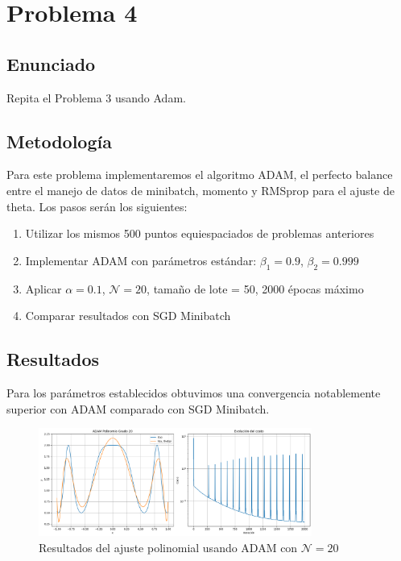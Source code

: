 \documentclass{article}
\begin{document}
\section{Problema 4}

\subsection{Enunciado}

Repita el Problema 3 usando Adam.

\subsection{Metodología}

Para este problema implementaremos el algoritmo ADAM, el perfecto balance entre el manejo de datos de minibatch, momento y RMSprop para el ajuste de theta. Los pasos serán los siguientes:

\begin{enumerate}
    \item Utilizar los mismos 500 puntos equiespaciados de problemas anteriores
    \item Implementar ADAM con parámetros estándar: $\beta_1 = 0.9$, $\beta_2 = 0.999$
    \item Aplicar $\alpha = 0.1$, $\mathcal{N} = 20$, tamaño de lote = 50, 2000 épocas máximo
    \item Comparar resultados con SGD Minibatch
\end{enumerate}

\subsection{Resultados}
\setcounter{equation}{0}

Para los parámetros establecidos obtuvimos una convergencia notablemente superior con ADAM comparado con SGD Minibatch.

\begin{figure}[H]
    \centering
    \includegraphics[width=0.8\textwidth]{images/4_adam.png}
    \caption{Resultados del ajuste polinomial usando ADAM con $\mathcal{N}=20$}
    \label{fig:adam_results}
\end{figure}
\end{document}
